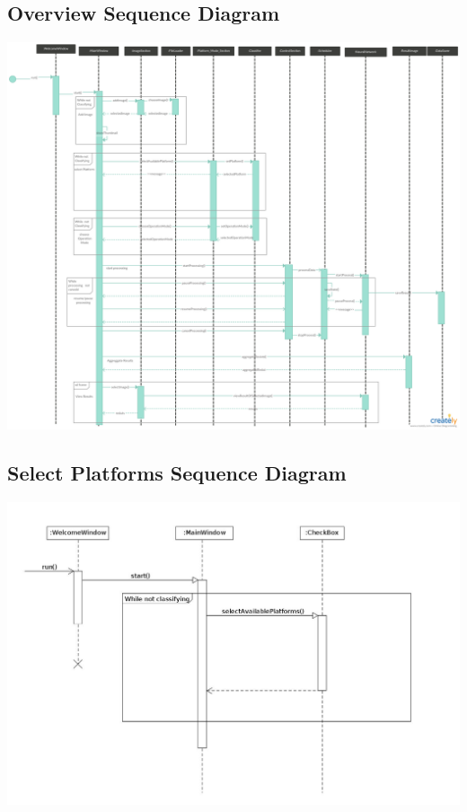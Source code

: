 \documentclass[parskip=full]{scrartcl}
\begin{document}
\subsection {Overview Sequence Diagram}

\begin{center}
\includegraphics[width=1.0\textwidth]{seq.png}
\end{center}

\pagebreak

\subsection {Select Platforms Sequence Diagram}

\begin{center}
\includegraphics[width=1.0\textwidth]{SelectPlatforms.jpg}
\end{center}
\end{document}
